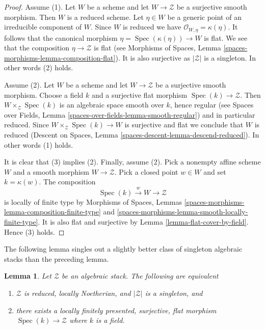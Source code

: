 \documentclass{stacks-project}
\theoremstyle{plain}
\newtheorem{lemma}[subsection]{Lemma}
\theoremstyle{definition}
\theoremstyle{remark}
\numberwithin{equation}{subsection}
\def\Spec{\mathop{\mathrm{Spec}}}
\begin{document}
\begin{proof}
Assume (1). Let $W$ be a scheme and
let $W \to \mathcal{Z}$ be a surjective smooth morphism. Then $W$ is
a reduced scheme. Let $\eta \in W$ be a generic point of an irreducible
component of $W$. Since $W$ is reduced we have
$\mathcal{O}_{W, \eta} = \kappa(\eta)$. It follows that the canonical
morphism $\eta = \Spec(\kappa(\eta)) \to W$ is flat. We see that the
composition $\eta \to \mathcal{Z}$ is flat (see
Morphisms of Spaces, Lemma \ref{spaces-morphisms-lemma-composition-flat}).
It is also surjective as $|\mathcal{Z}|$ is a singleton. In other words
(2) holds.

\medskip\noindent
Assume (2). Let $W$ be a scheme and
let $W \to \mathcal{Z}$ be a surjective smooth morphism. Choose a field
$k$ and a surjective flat morphism $\Spec(k) \to \mathcal{Z}$.
Then $W \times_\mathcal{Z} \Spec(k)$ is an algebraic space smooth
over $k$, hence regular (see
Spaces over Fields, Lemma \ref{spaces-over-fields-lemma-smooth-regular})
and in particular reduced. Since $W \times_\mathcal{Z} \Spec(k) \to W$
is surjective and flat we conclude that $W$ is reduced
(Descent on Spaces, Lemma \ref{spaces-descent-lemma-descend-reduced}).
In other words (1) holds.

\medskip\noindent
It is clear that (3) implies (2). Finally, assume (2). Pick a nonempty
affine scheme $W$ and a smooth morphism $W \to \mathcal{Z}$. Pick a closed
point $w \in W$ and set $k = \kappa(w)$. The composition
$$
\Spec(k) \xrightarrow{w} W \longrightarrow \mathcal{Z}
$$
is locally of finite type by
Morphisms of Spaces, Lemmas
\ref{spaces-morphisms-lemma-composition-finite-type} and
\ref{spaces-morphisms-lemma-smooth-locally-finite-type}.
It is also flat and surjective by
Lemma \ref{lemma-flat-cover-by-field}.
Hence (3) holds.
\end{proof}

\noindent
The following lemma singles out a slightly better class of singleton
algebraic stacks than the preceding lemma.

\begin{lemma}
\label{lemma-unique-point-better}
Let $\mathcal{Z}$ be an algebraic stack. The following are equivalent
\begin{enumerate}
\item $\mathcal{Z}$ is reduced, locally Noetherian, and $|\mathcal{Z}|$
is a singleton, and
\item there exists a locally finitely presented, surjective, flat morphism
$\Spec(k) \to \mathcal{Z}$ where $k$ is a field.
\end{enumerate}
\end{lemma}
\end{document}

